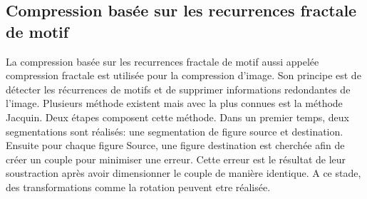\documentclass[a4paper]{report}
\begin{document}
	\subsection{Compression basée sur les recurrences fractale de motif}
		La compression basée sur les recurrences fractale de motif aussi appelée compression fractale est utilisée pour la compression d'image. Son principe est de détecter les récurrences de motifs et de supprimer informations redondantes de l'image. Plusieurs méthode existent mais avec la plus connues est la méthode Jacquin. Deux étapes composent cette méthode. Dans un premier temps, deux segmentations sont réalisés: une segmentation de figure source et destination. Ensuite pour chaque figure Source, une figure destination est cherchée afin de créer un couple pour minimiser une erreur. Cette erreur est le résultat de leur soustraction après avoir dimensionner le couple de manière identique. A ce stade, des transformations comme la rotation peuvent etre réalisée.
		
         
\end{document}
